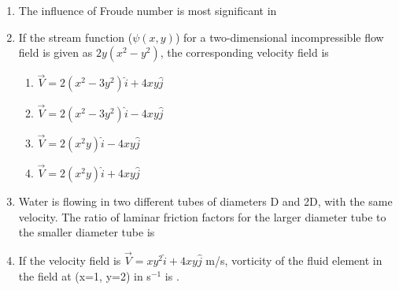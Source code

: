 \documentclass[a4paper,10pt]{article}
\begin{document}
\begin{enumerate}
    \item The influence of Froude number is most significant in
    \hfill{}
    \begin{enumerate}[label=\Alph*)]
    \end{enumerate}

    \item If the stream function ($\psi(x,y)$) for a two-dimensional incompressible flow field is given as $2y(x^2 - y^2)$, the corresponding velocity field is
    \hfill{}
    \begin{enumerate}[label=\Alph*)]
        \item $\vec{V} = 2(x^2 - 3y^2)\hat{i} + 4xy\hat{j}$
        \item $\vec{V} = 2(x^2 - 3y^2)\hat{i} - 4xy\hat{j}$
        \item $\vec{V} = 2(x^2y)\hat{i} - 4xy\hat{j}$
        \item $\vec{V} = 2(x^2y)\hat{i} + 4xy\hat{j}$
    \end{enumerate}

    \item Water is flowing in two different tubes of diameters D and 2D, with the same velocity. The ratio of laminar friction factors for the larger diameter tube to the smaller diameter tube is
    \hfill{}
    \begin{enumerate}[label=\Alph*)]
    \end{enumerate}

    \item If the velocity field is $\vec{V} = xy^2\hat{i} + 4xy\hat{j}$ m/s, vorticity of the fluid element in the field at (x=1, y=2) in s$^{-1}$ is \underline{\hspace{2cm}}.
    \hfill{}


\end{enumerate}
\end{document}
